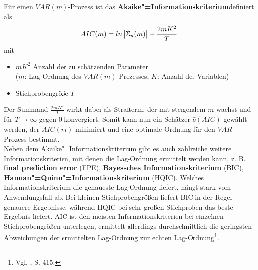 \documentclass[
	a4paper,
	12pt,
	bibliography=totocnumbered,
	twoside,
]{scrreprt}
\begin{document}
\begin{Definition}
	Für einen $VAR(m)$-Prozess ist das \textbf{Akaike"=Informationskriterium}\footnotemark definiert als
	\begin{equation}
		AIC(m) = ln \left| \Tilde{\Sigma}_u (m) \right| + \frac{2mK^2}{T}
	\end{equation}
	mit
	\begin{itemize}
			\item $mK^2$ Anzahl der zu schätzenden Parameter\\
			($m$: Lag-Ordnung des $VAR(m)$-Prozesses, $K$: Anzahl der Variablen)
			\item Stichprobengröße $T$
	\end{itemize}
\end{Definition}

Der Summand $\frac{2mK^2}{T}$ wirkt dabei als Strafterm, der mit steigendem $m$ wächst und für $T \rightarrow \infty$ gegen $0$ konvergiert. Somit kann nun ein Schätzer $\hat{p}(AIC)$ gewählt werden, der $AIC(m)$ minimiert und eine optimale Ordnung für den $VAR$-Prozess bestimmt. \\

Neben dem Akaike"=Informationskriterium gibt es auch zahlreiche weitere Informationskriterien, mit denen die Lag-Ordnung ermittelt werden kann, z. B. \textbf{final prediction error} (FPE), \textbf{Bayessches Informationskriterium} (BIC), \textbf{Hannan"=Quinn"=Informationskriterium} (HQIC). Welches Informationskriterium die genaueste Lag-Ordnung liefert, hängt stark vom Anwendungsfall ab. Bei kleinen Stichprobengrößen liefert BIC in der Regel genauere Ergebnisse, während HQIC bei sehr großen Stichproben das beste Ergebnis liefert. AIC ist den meisten Informationskriterien bei einzelnen Stichprobengrößen unterlegen, ermittelt allerdings durchschnittlich die geringsten Abweichungen der ermittelten Lag-Ordnung zur echten Lag-Ordnung\footnote{Vgl. \citet{shittu2009}, S. 415.}.



\end{document}
